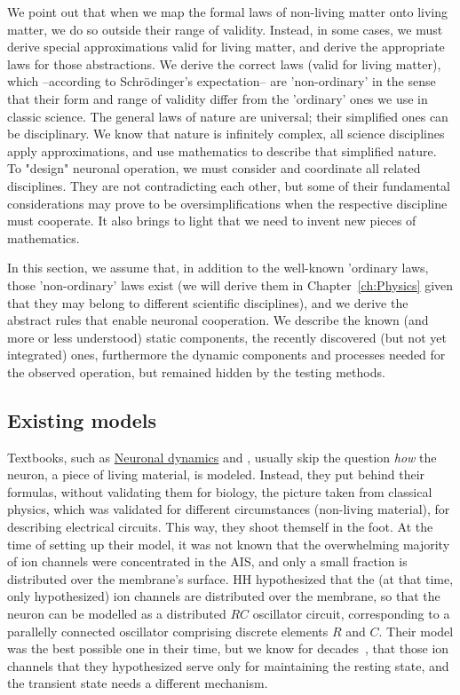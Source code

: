 We point out that when we map the formal laws of non-living matter onto living matter, we do so outside their range of validity. Instead, in some cases, we must derive special approximations valid for living matter, and derive the
appropriate laws for those abstractions. 
We derive the correct laws (valid for living matter), which 
--according to Schrödinger's expectation-- are 'non-ordinary' in the sense
that their form and range of validity differ from the 'ordinary' ones
we use in classic science. The general laws of nature are universal; their
simplified ones can be disciplinary.
We know that nature is infinitely complex, all science disciplines
apply approximations, and use mathematics to describe that
simplified nature.
To "design" neuronal operation, we must consider and coordinate all related disciplines. They are
not contradicting each other, but some of their fundamental considerations may prove to be oversimplifications when the respective discipline must 
cooperate. It also brings to light that we need to
invent new pieces of mathematics.

In this section, we assume that, in addition to the well-known
'ordinary laws, those 'non-ordinary' laws exist
(we will derive them in Chapter~\ref{ch:Physics} given that they may belong 
to different scientific disciplines),
and we derive the abstract rules that enable neuronal cooperation.
We describe the known (and more or less understood) static components,
the recently discovered (but not yet integrated) ones, furthermore
the dynamic components and processes needed for the observed operation, 
but remained hidden by the testing methods.
 


\subsection{Existing models\label{sec:SINGLE_ExistingModels}}

Textbooks, such as
\href{https://neuronaldynamics.epfl.ch/}{Neuronal dynamics} and \cite{KochBiophysics:1999},
usually skip the question \textit{how} the neuron, a piece of living material, is modeled.
Instead, they put behind their formulas, without validating them for biology, the picture taken
from classical physics, which was validated for different circumstances (non-living material),
for describing electrical circuits.
This way, they shoot themself in the foot. 
At the time of setting up their model, it was not known that the overwhelming majority of ion channels were concentrated in the \gls{AIS}, and only a small fraction is distributed over the membrane's surface. \gls{HH} hypothesized that the (at that time, only hypothesized) ion channels are distributed over the membrane, so that the neuron can be modelled as a distributed $RC$ oscillator circuit, corresponding to a parallelly connected oscillator comprising discrete elements $R$ and $C$.
Their model was the best possible one in their time, but we know for decades~\cite{ActionPotentialGenerationNatrium:2008,AIS_NeuronalPolarity:2010,BackpropagationAP:2012,AxonInitialSegmentStructure:2018,AIS_Updated_Viewpoint:2018}, that those ion channels that they hypothesized serve only for maintaining the resting state,
and the transient state needs a different mechanism.


